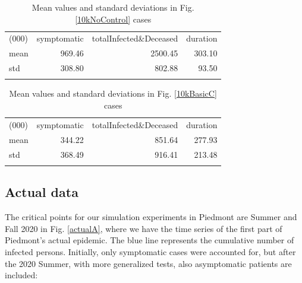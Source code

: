 \documentclass[graybox]{svmult}
\begin{document}
\begin{table}[t]
\center
\begin{tabular}{lrrr}
\hline\noalign{\smallskip}
(000) & symptomatic & totalInfected\&Deceased & duration \\
\noalign{\smallskip}\svhline\noalign{\smallskip}
mean & 969.46 & 2500.45 & 303.10 \\
std & 308.80 & 802.88 & 93.50 \\
\hline\noalign{\smallskip}
\end{tabular}
\caption{Mean values and standard deviations in Fig. \ref{10kNoControl} cases}
\label{noCTab}
\end{table}


\begin{table}[t]
\center
\begin{tabular}{lrrr}
\hline\noalign{\smallskip}
(000) & symptomatic & totalInfected\&Deceased & duration \\
\noalign{\smallskip}\svhline\noalign{\smallskip}
mean & 344.22 & 851.64 & 277.93 \\
std & 368.49 & 916.41 & 213.48 \\
\hline\noalign{\smallskip}
\end{tabular}
\caption{Mean values and standard deviations in Fig. \ref{10kBasicC} cases}
\label{basicCTab}
\end{table}


\subsection{Actual data}
\label{actual}

The critical points for our simulation experiments in Piedmont are Summer and Fall 2020 in Fig. \ref{actualA}, where we have the time series of the first part of Piedmont's actual epidemic. The blue line represents the cumulative number of infected persons. Initially, only symptomatic cases were accounted for, but after the 2020 Summer, with more generalized tests, also asymptomatic patients are included:
\end{document}
